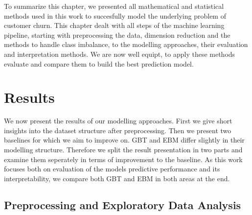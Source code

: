 \documentclass[12pt,titlepage]{article}
\begin{document}
To summarize this chapter, we presented all mathematical and statistical methods used in this work to succesfully model the underlying problem of customer churn. This chapter dealt with all steps of the machine learning pipeline, starting with preprocessing the data, dimension reduction and the methods to handle class imbalance, to the modelling approaches, their evaluation and interpretation methods. We are now well equipt, to apply these methods evaluate and compare them to build the best prediction model. \\


\section{Results} \par

We now present the results of our modelling approaches. First we give short insights into the dataset structure after preprocessing. Then we present two baselines for which we aim to improve on. GBT and EBM differ slightly in their modelling structure. Therefore we split the result presentation in two parts and examine them seperately in terms of improvement to the baseline. As this work focuses both on evaluation of the models predictive performance and its interpretability, we compare both GBT and EBM in both areas at the end. \\

\subsection{Preprocessing and Exploratory Data Analysis} \par
\end{document}
